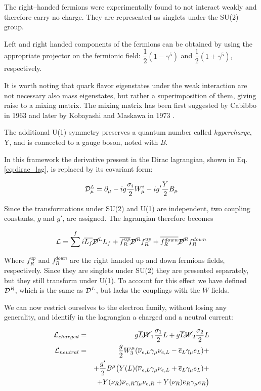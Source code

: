 The right--handed fermions were experimentally found to not interact weakly and therefore carry no charge. They are represented as singlets under the SU(2) group.

Left and right handed components of the fermions can be obtained by using the appropriate projector on the fermionic field: $\dfrac{1}{2}(1-\gamma^5)$ and $\dfrac{1}{2}(1+\gamma^5)$, respectively.

It is worth noting that quark flavor eigenstates under the weak interaction are not necessary also mass eigenstates, but rather a superimposition of them, giving raise to a mixing matrix. The mixing matrix has been first suggested by Cabibbo in 1963 \cite{Cabibbo:1963yz} and later by Kobayashi and Maskawa in 1973 \cite{Kobayashi:1973fv}.

The additional U(1) symmetry preserves a quantum number called \emph{hypercharge}, Y, and is connected to a gauge boson, noted with $B$. 

In this framework the derivative present in the Dirac lagrangian, shown in Eq. \ref{eq:dirac_lag}, is replaced by its covariant form:

\begin{equation}
\mathcal{D}^L_\mu = \partial_\mu - ig\dfrac{\sigma_i}{2}W^i_\mu - ig'\dfrac{Y}{2}B_\mu
\end{equation}

Since the transformations under SU(2) and U(1) are independent, two coupling constants, $g$ and $g'$, are assigned. The lagrangian therefore becomes

\begin{equation}
\mathcal{L} = \sum^f i \overline{L_f}\cancel{\mathcal{D}}^LL_f + \overline{f^{up}_R}\cancel{\mathcal{D}}^Rf^{up}_R  + \overline{f^{down}_R}\cancel{\mathcal{D}}^Rf^{down}_R 
\end{equation}

Where $f^{up}_R$ and $f^{down}_R$ are the right handed up and down fermions fields, respectively. Since they are singlets under SU(2) they are presented separately, but they still transform under U(1). To account for this effect we have defined $\mathcal{D}^R$, which is the same as $\mathcal{D}^L$, but lacks the couplings with the $W$ fields. 

We can now restrict ourselves to the electron family, without losing any generality, and identify in the lagrangian a charged and a neutral current:

\begin{eqnarray}
\mathcal{L}_{charged} &=& g \overline{L} \cancel{W}_1 \dfrac{\sigma_1}{2}L + g \overline{L} \cancel{W}_2 \dfrac{\sigma_2}{2}L \\ 
\mathcal{L}_{neutral} &=& \dfrac{g}{2} W_3^\mu (\overline{\nu}_{e,L}\gamma_\mu\nu_{e,L} - \overline{e}_L\gamma_\mu e_L) +  \nonumber \\
& & + \dfrac{g'}{2} B^\mu \mathbf{\big(} Y(L) ( \overline{\nu}_{e,L}\gamma_\mu\nu_{e,L} + \overline{e}_L\gamma_\mu e_L ) + \nonumber \\
& & + Y(\nu_R) \overline{\nu}_{e,R}\gamma_\mu\nu_{e,R} + Y(\nu_R)  \overline{e}_R\gamma_\mu e_R \mathbf{\big)}
\end{eqnarray}

